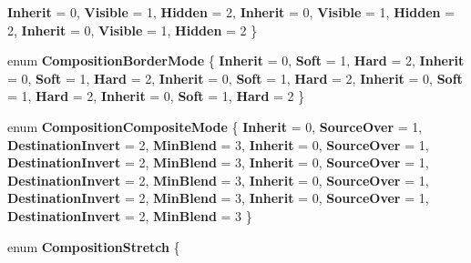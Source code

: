 \begin{DoxyCompactItemize}
{\bfseries Inherit} = 0, 
{\bfseries Visible} = 1, 
\newline
{\bfseries Hidden} = 2, 
{\bfseries Inherit} = 0, 
{\bfseries Visible} = 1, 
{\bfseries Hidden} = 2, 
\newline
{\bfseries Inherit} = 0, 
{\bfseries Visible} = 1, 
{\bfseries Hidden} = 2
 \}
\item 
\mbox{\label{namespace_windows_1_1_u_i_1_1_composition_ad094aac2d72715708083e1a34f7835f0}} 
enum {\bfseries Composition\+Border\+Mode} \{ \newline
{\bfseries Inherit} = 0, 
{\bfseries Soft} = 1, 
{\bfseries Hard} = 2, 
{\bfseries Inherit} = 0, 
\newline
{\bfseries Soft} = 1, 
{\bfseries Hard} = 2, 
{\bfseries Inherit} = 0, 
{\bfseries Soft} = 1, 
\newline
{\bfseries Hard} = 2, 
{\bfseries Inherit} = 0, 
{\bfseries Soft} = 1, 
{\bfseries Hard} = 2, 
\newline
{\bfseries Inherit} = 0, 
{\bfseries Soft} = 1, 
{\bfseries Hard} = 2
 \}
\item 
\mbox{\label{namespace_windows_1_1_u_i_1_1_composition_a70df9b7791d5834e00518dd51febcf2e}} 
enum {\bfseries Composition\+Composite\+Mode} \{ \newline
{\bfseries Inherit} = 0, 
{\bfseries Source\+Over} = 1, 
{\bfseries Destination\+Invert} = 2, 
{\bfseries Min\+Blend} = 3, 
\newline
{\bfseries Inherit} = 0, 
{\bfseries Source\+Over} = 1, 
{\bfseries Destination\+Invert} = 2, 
{\bfseries Min\+Blend} = 3, 
\newline
{\bfseries Inherit} = 0, 
{\bfseries Source\+Over} = 1, 
{\bfseries Destination\+Invert} = 2, 
{\bfseries Min\+Blend} = 3, 
\newline
{\bfseries Inherit} = 0, 
{\bfseries Source\+Over} = 1, 
{\bfseries Destination\+Invert} = 2, 
{\bfseries Min\+Blend} = 3, 
\newline
{\bfseries Inherit} = 0, 
{\bfseries Source\+Over} = 1, 
{\bfseries Destination\+Invert} = 2, 
{\bfseries Min\+Blend} = 3
 \}
\item 
\mbox{\label{namespace_windows_1_1_u_i_1_1_composition_abe147aa23cb612204b73bb75dc3137e8}} 
enum {\bfseries Composition\+Stretch} \{ \newline

\end{DoxyCompactItemize}
